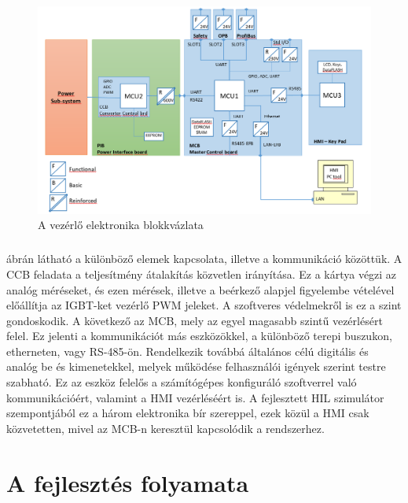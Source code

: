 
\begin{figure}[h]
	\centering
	\includegraphics[width = \textwidth]{figures/architect.png}
	\caption{A vezérlő elektronika blokkvázlata} 
	\label{fig:hw_architect}
\end{figure}

\paragraph{}
 ábrán látható a különböző elemek kapcsolata, illetve a kommunikáció közöttük. A CCB feladata a teljesítmény átalakítás közvetlen irányítása. Ez a kártya végzi az analóg méréseket, és ezen mérések, illetve a beérkező alapjel figyelembe vételével előállítja az IGBT-ket vezérlő PWM jeleket. A szoftveres védelmekről is ez a szint gondoskodik. A következő az MCB, mely az egyel magasabb szintű vezérlésért felel. Ez jelenti a kommunikációt más eszközökkel, a különböző terepi buszukon, etherneten, vagy RS-485-ön. Rendelkezik továbbá általános célú digitális és analóg be és kimenetekkel, melyek működése felhasználói igények szerint testre szabható. Ez az eszköz felelős a számítógépes konfiguráló szoftverrel való kommunikációért, valamint a HMI vezérléséért is. A fejlesztett HIL szimulátor szempontjából ez a három elektronika bír szereppel, ezek közül a HMI csak közvetetten, mivel az MCB-n keresztül kapcsolódik a rendszerhez.

\chapter{A fejlesztés folyamata}

